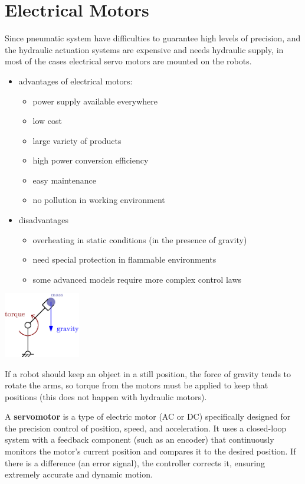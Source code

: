 \documentclass[10pt, letterpaper]{report}
\begin{document}
\section{Electrical Motors}
Since pneumatic system have difficulties to guarantee  high levels of precision, and the hydraulic actuation systems are expensive and needs hydraulic supply, in most of the cases electrical servo motors are mounted on the robots.\begin{itemize}
    \item advantages of electrical motors:\begin{itemize}
        \item power supply available everywhere
        \item low cost
        \item large variety of products
\item high power conversion efficiency
\item easy maintenance
\item no pollution in working environment
    \end{itemize}
    \item disadvantages\begin{itemize}
        \item overheating in static conditions (in the presence of gravity)
\item need special protection in flammable environments
\item some advanced models require more complex control laws
    \end{itemize}
\end{itemize}\begin{center}
    \includegraphics[width=0.25\textwidth ]{images/overheating.eps} 
\end{center}
If a robot should keep an object in a still position, the force of gravity tends to rotate the arms, so torque from the motors must be applied to keep that positions (this does not happen with hydraulic motors).
\begin{definition}
    A \textbf{servomotor} is a type of electric motor (AC or DC) specifically designed for the precision control of position, speed, and acceleration. It uses a closed-loop system with a feedback component (such as an encoder) that continuously monitors the motor's current position and compares it to the desired position. If there is a difference (an error signal), the controller corrects it, ensuring extremely accurate and dynamic motion.
\end{definition}
\end{document}
